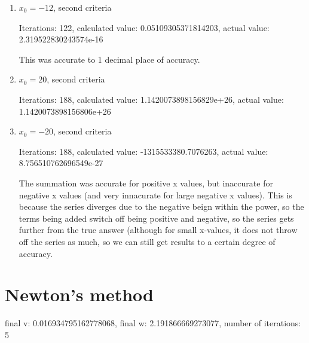 \documentclass[12pt]{article}
\begin{document}
\begin{enumerate}
\item $x_0=-12$, second criteria

\begin{footnotesize}
\begin{spacing}{-.8}
Iterations: 122, calculated value: 0.05109305371814203, actual value: 2.319522830243574e-16
\end{spacing}
\end{footnotesize}
\vspace{.25in}
This was accurate to 1 decimal place of accuracy.

\item $x_0=20$, second criteria

\begin{footnotesize}
\begin{spacing}{-.8}
Iterations: 188, calculated value: 1.1420073898156829e+26, actual value: 1.1420073898156806e+26
\end{spacing}
\end{footnotesize}

\item $x_0=-20$, second criteria

\begin{footnotesize}
\begin{spacing}{-.8}
Iterations: 188, calculated value: -1315533380.7076263, actual value: 8.756510762696549e-27
\end{spacing}
\end{footnotesize}
\vspace{.25in}
The summation was accurate for positive x values, but inaccurate for negative x values (and very innacurate for large negative x values).  This is because the series diverges due to the negative beign within the power, so the terms being added switch off being positive and negative, so the series gets further from the true answer (although for small x-values, it does not throw off the series as much, so we can still get results to a certain degree of accuracy.

\end{enumerate}

\section{Newton's method}

\begin{footnotesize}
\begin{spacing}{-.8}
final v: 0.016934795162778068, final w: 2.191866669273077, number of iterations: 5
\end{spacing}
\end{footnotesize}
\end{document}

